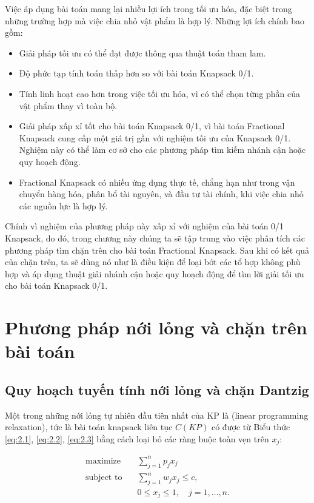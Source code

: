 Việc áp dụng bài toán  mang lại nhiều lợi ích trong tối ưu hóa, đặc biệt trong những trường hợp mà việc chia nhỏ vật phẩm là hợp lý. Những lợi ích chính bao gồm:
\begin{itemize}
    \item Giải pháp tối ưu có thể đạt được thông qua thuật toán tham lam.
    \item Độ phức tạp tính toán thấp hơn so với bài toán Knapsack 0/1.
    \item Tính linh hoạt cao hơn trong việc tối ưu hóa, vì có thể chọn từng phần của vật phẩm thay vì toàn bộ.
    \item Giải pháp xấp xỉ tốt cho bài toán Knapsack 0/1, vì bài toán Fractional Knapsack cung cấp một giá trị gần với nghiệm tối ưu của Knapsack 0/1. Nghiệm này có thể làm cơ sở cho các phương pháp tìm kiếm nhánh cận hoặc quy hoạch động.
    \item Fractional Knapsack có nhiều ứng dụng thực tế, chẳng hạn như trong vận chuyển hàng hóa, phân bổ tài nguyên, và đầu tư tài chính, khi việc chia nhỏ các nguồn lực là hợp lý.
\end{itemize}

Chính vì nghiệm của phương pháp này xấp xỉ với nghiệm của bài toán 0/1 Knapsack, do đó, trong chương này chúng ta sẽ tập trung vào việc phân tích các phương pháp tìm chặn trên cho bài toán Fractional Knapsack. Sau khi có kết quả của chặn trên, ta sẽ dùng nó như là điều kiện để loại bớt các tổ hợp không phù hợp và áp dụng thuật giải nhánh cận hoặc quy hoạch động để tìm lời giải tối ưu cho bài toán  Knapsack 0/1. 
\section{Phương pháp nới lỏng và chặn trên bài toán}
\subsection{Quy hoạch tuyến tính nới lỏng và chặn Dantzig}

Một trong những nới lỏng tự nhiên đầu tiên nhất của KP là  (linear programming relaxation), tức là bài toán knapsack liên tục $C(KP)$ có được từ Biểu thức \eqref{eq:2.1}, \eqref{eq:2.2}, \eqref{eq:2.3} bằng cách loại bỏ các ràng buộc toàn vẹn trên $x_j$:

\begin{align}
    \text{maximize}\quad&\sum_{j = 1}^np_jx_j \\
     \text{subject to}\quad & \sum_{j = 1}^nw_jx_j \leq c,\\
     & 0 \leq x_j \leq 1, \quad j = 1, \dots, n.
\end{align}

